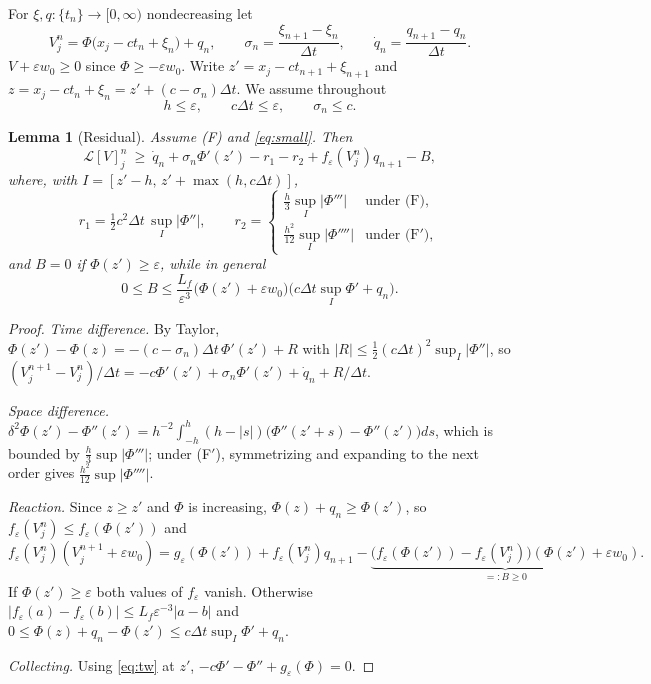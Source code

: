 \documentclass[11pt]{amsart}
\newtheorem{lemma}[theorem]{Lemma}
\theoremstyle{remark}
\newcommand{\ve}{\varepsilon}
\newcommand{\Lop}{\mathcal{L}}
\begin{document}
For $\xi,q\colon\{t_n\}\to[0,\infty)$ nondecreasing let
\[
V^n_j=\Phi\big(x_j-ct_n+\xi_n\big)+q_n,\qquad
\sigma_n=\frac{\xi_{n+1}-\xi_n}{\Delta t},\qquad \dot q_n=\frac{q_{n+1}-q_n}{\Delta t}.
\]
$V+\ve w_0\ge0$ since $\Phi\ge-\ve w_0$. Write $z'=x_j-ct_{n+1}+\xi_{n+1}$ and
$z=x_j-ct_n+\xi_n=z'+(c-\sigma_n)\Delta t$. We assume throughout
\begin{equation}\label{eq:small}
h\le\ve,\qquad c\Delta t\le\ve,\qquad \sigma_n\le c.
\end{equation}

\begin{lemma}[Residual]\label{lem:residual}
Assume (F) and \eqref{eq:small}. Then
\[
\Lop[V]^n_j\ \ge\ \dot q_n+\sigma_n\Phi'(z')-r_1-r_2+f_\ve(V^n_j)q_{n+1}-B,
\]
where, with $I=[z'-h,\,z'+\max(h,c\Delta t)]$,
\[
r_1=\tfrac12c^2\Delta t\,\sup_I|\Phi''|,\qquad
r_2=\begin{cases}\tfrac h3\sup_I|\Phi'''|&\text{under (F)},\\[2pt]
\tfrac{h^2}{12}\sup_I|\Phi''''|&\text{under (F$'$)},\end{cases}
\]
and $B=0$ if $\Phi(z')\ge\ve$, while in general
\[
0\le B\le\frac{L_f}{\ve^3}\big(\Phi(z')+\ve w_0\big)\big(c\Delta t\sup_I\Phi'+q_n\big).
\]
\end{lemma}

\begin{proof}
\emph{Time difference.} By Taylor,
$\Phi(z')-\Phi(z)=-(c-\sigma_n)\Delta t\,\Phi'(z')+R$ with
$|R|\le\frac12(c\Delta t)^2\sup_I|\Phi''|$, so
$(V^{n+1}_j-V^n_j)/\Delta t=-c\Phi'(z')+\sigma_n\Phi'(z')+\dot q_n+R/\Delta t$.

\emph{Space difference.}
$\delta^2\Phi(z')-\Phi''(z')=h^{-2}\int_{-h}^h(h-|s|)\big(\Phi''(z'+s)-\Phi''(z')\big)ds$,
which is bounded by $\frac h3\sup|\Phi'''|$; under (F$'$), symmetrizing and
expanding to the next order gives $\frac{h^2}{12}\sup|\Phi''''|$.

\emph{Reaction.} Since $z\ge z'$ and $\Phi$ is increasing,
$\Phi(z)+q_n\ge\Phi(z')$, so $f_\ve(V^n_j)\le f_\ve(\Phi(z'))$ and
\[
f_\ve(V^n_j)(V^{n+1}_j+\ve w_0)=g_\ve(\Phi(z'))+f_\ve(V^n_j)q_{n+1}
-\underbrace{\big(f_\ve(\Phi(z'))-f_\ve(V^n_j)\big)(\Phi(z')+\ve w_0)}_{=:B\ge0}.
\]
If $\Phi(z')\ge\ve$ both values of $f_\ve$ vanish. Otherwise
$|f_\ve(a)-f_\ve(b)|\le L_f\ve^{-3}|a-b|$ and
$0\le\Phi(z)+q_n-\Phi(z')\le c\Delta t\sup_I\Phi'+q_n$.

\emph{Collecting.} Using \eqref{eq:tw} at $z'$,
$-c\Phi'-\Phi''+g_\ve(\Phi)=0$.
\end{proof}
\end{document}
